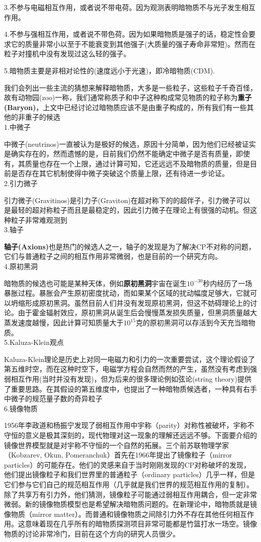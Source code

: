 \documentclass[UTF8]{ctexart}
\begin{document}
3.不参与电磁相互作用，或者说不带电荷。因为观测表明暗物质不与光子发生相互作用。

4.不参与强相互作用，或者说不带色荷。因为如果暗物质是强子的话，稳定性会要求它的质量非常小以至于不能衰变到其他强子(大质量的强子寿命非常短)。然而在粒子对撞机中没有发现过这么轻的强子。

5.暗物质主要是非相对论性的(速度远小于光速)，即冷暗物质(CDM).

我们会列出一些主流的猜想来解释暗物质，大多是一些粒子，这些粒子千奇百怪，故有动物园(zoo)一称，我们通常称质子和中子这种构成常见物质的粒子称为\textbf{重子(Baryon)}，上文中已经讨论过暗物质应该不是由重子构成的，所有我们有一些其他的非重子的候选\\
1.中微子

中微子(neutrinos)一直被认为是极好的候选，原因十分简单，因为他们已经被证实是确实存在的，然而遗憾的是，目前我们仍然不能确定中微子是否有质量，即使有，其质量也存在一个上限，通过计算可知，它还远远不及暗物质的质量，但是目前是否存在其它机制使得中微子突破这个质量上限，还有待进一步论证。\\
2.引力微子

引力微子(Gravitinos)是引力子(Graviton)在超对称下的的超伴子，引力微子可以是最轻的超对称粒子而且是最稳定的，因此引力微子在理论上有很强的动机。但这种粒子非常难观测到\\
3.轴子

\textbf{轴子(Axions)}也是热门的候选人之一，轴子的发现是为了解决CP不对称的问题，它们与普通粒子之间的相互作用非常微弱，也是目前的一个研究方向。\\
4.原初黑洞

暗物质的候选也可能是某种天体，例如\textbf{原初黑洞}宇宙在诞生$10^{-30}$秒内经历了一场暴胀过程。暴胀会产生原初密度扰动，而如果某个区域的扰动幅度足够大，它就可以坍缩形成原初黑洞。虽然目前人们并没有发现原初黑洞，但这不妨碍理论上的讨论。由于霍金辐射效应，原初黑洞从诞生后会慢慢蒸发损失质量，但黑洞质量越大蒸发速度越慢，因此计算可知质量大于$10^{15}$克的原初黑洞可以存活到今天充当暗物质。\\
5.Kaluza-Klein观点

Kaluza-Klein理论是历史上对同一电磁力和引力的一次重要尝试，这个理论假设了第五维时空，而在这种时空下，电磁学方程会自然而然的产生，虽然没有考虑到强弱相互作用(当时并没有发现)，但为后来的很多理论例如弦论(string theory)提供了重要思路。在其假设的第五维度中，也提出了一种暗物质候选者，一种具有右手中微子的规范量子数的奇异粒子\\
6.镜像物质

1956年李政道和杨振宁发现了弱相互作用中宇称（parity）对称性被破坏，宇称不守恒的意义是极其深刻的，现代物理对这一现象的理解还远远不够。下面要介绍的镜像世界模型就是对宇称不守恒的一个自然的拓展。三个前苏联物理学家（Kobzarev, Okun, Pomeranchuk）首先在1966年提出了镜像粒子（mirror particles）的可能存在。他们的灵感来自于当时刚刚发现的CP对称破坏的发现，他们提出镜像粒子和我们世界里的普通粒子（ordinary particles）几乎一样，但是它们参与它们自己的规范相互作用（几乎就是我们世界的规范相互作用的复制）。除了共享万有引力外，他们猜测，镜像粒子可能通过弱相互作用耦合，但一定非常微弱。新的镜像物质模型也是希望解决暗物质问题的。在新理论中，暗物质就是镜像物质（mirror matter）。而普通和镜像物质之间除引力外不存在其他任何相互作用。这意味着现在几乎所有的暗物质探测项目非常可能都是竹篮打水一场空。镜像物质的讨论非常冷门，目前在这个方向的研究人员很少。
\end{document}
